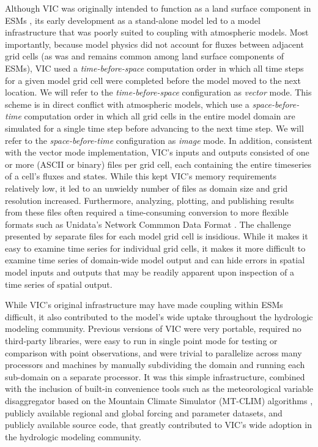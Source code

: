 \documentclass[gmd, manuscript]{copernicus}
\begin{document}
  Although VIC was originally intended to function as a land surface component in ESMs \citep{Liang_1994}, its early development as a stand-alone model led to a model infrastructure that was poorly suited to coupling with atmospheric models.  Most importantly, because model physics did not account for fluxes between adjacent grid cells (as was and remains common among land surface components of ESMs), VIC used a \textit{time-before-space} computation order in which all time steps for a given model grid cell were completed before the model moved to the next location. We will refer to the \textit{time-before-space} configuration as \textit{vector} mode.  This scheme is in direct conflict with atmospheric models, which use a \textit{space-before-time} computation order in which all grid cells in the entire model domain are simulated for a single time step before advancing to the next time step. We will refer to the \textit{space-before-time} configuration as \textit{image} mode. In addition, consistent with the vector mode implementation, VIC's inputs and outputs consisted of one or more (ASCII or binary) files per grid cell, each containing the entire timeseries of a cell's fluxes and states. While this kept VIC's memory requirements relatively low, it led to an unwieldy number of files as domain size and grid resolution increased. Furthermore, analyzing, plotting, and publishing results from these files often required a time-consuming conversion to more flexible formats such as Unidata's Network Commmon Data Format \citep[NetCDF; ][]{Rew_1990}. The challenge presented by separate files for each model grid cell is insidious. While it makes it easy to examine time series for individual grid cells, it makes it more difficult to examine time series of domain-wide model output and can hide errors in spatial model inputs and outputs that may be readily apparent upon inspection of a time series of spatial output.

  While VIC's original infrastructure may have made coupling within ESMs difficult, it also contributed to the model's wide uptake throughout the hydrologic modeling community. Previous versions of VIC were very portable, required no third-party libraries, were easy to run in single point mode for testing or comparison with point observations, and were trivial to parallelize across many processors and machines by manually subdividing the domain and running each sub-domain on a separate processor. It was this simple infrastructure, combined with the inclusion of built-in convenience tools such as the meteorological variable disaggregator based on the Mountain Climate Simulator (MT-CLIM) algorithms \citep{Thornton_1999,Bohn_2013}, publicly available regional and global forcing and parameter datasets, and publicly available source code, that greatly contributed to VIC's wide adoption in the hydrologic modeling community.
\end{document}
